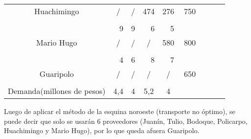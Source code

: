 \documentclass[12pt,letterpaper]{article}
\begin{document}
\begin{center}
\begin{tabular}{ccc|ccc|ccc|ccc|ccc|ccc|ccc}
\multicolumn{3}{c|}{Huachimingo} & \multicolumn{3}{c|}{/} & \multicolumn{3}{c|}{/} & \multicolumn{3}{c|}{474} & \multicolumn{3}{c|}{276}& \multicolumn{3}{c}{750}\\
\multicolumn{3}{c|}{} & \multicolumn{3}{c|}{} & \multicolumn{3}{c|}{} & \multicolumn{3}{c|}{} & \multicolumn{3}{c|}{}\\
\cline{1-15}
\multicolumn{3}{c|}{} & \multicolumn{3}{r|}{9} & \multicolumn{3}{r|}{9} & \multicolumn{3}{r|}{6} & \multicolumn{3}{r|}{5} \\
\multicolumn{3}{c|}{Mario Hugo} & \multicolumn{3}{c|}{/} & \multicolumn{3}{c|}{/} & \multicolumn{3}{c|}{/} & \multicolumn{3}{c|}{580}& \multicolumn{3}{c}{800}\\
\multicolumn{3}{c|}{} & \multicolumn{3}{c|}{} & \multicolumn{3}{c|}{} & \multicolumn{3}{c|}{} & \multicolumn{3}{c|}{}\\
\cline{1-15}
\multicolumn{3}{c|}{} & \multicolumn{3}{r|}{4} & \multicolumn{3}{r|}{6} & \multicolumn{3}{r|}{8} & \multicolumn{3}{r|}{7} \\
\multicolumn{3}{c|}{Guaripolo} & \multicolumn{3}{c|}{/} & \multicolumn{3}{c|}{/} & \multicolumn{3}{c|}{/} & \multicolumn{3}{c|}{/}& \multicolumn{3}{c}{650}\\
\multicolumn{3}{c|}{} & \multicolumn{3}{c|}{} & \multicolumn{3}{c|}{} & \multicolumn{3}{c|}{} & \multicolumn{3}{c|}{}\\
\cline{1-15}
\multicolumn{3}{c|}{Demanda(millones de pesos)} & \multicolumn{3}{c|}{4,4} & \multicolumn{3}{c|}{4} & \multicolumn{3}{c|}{5,2}& \multicolumn{3}{c|}{4} & \multicolumn{3}{c}{}\\
\end{tabular}
\end{center}

Luego de aplicar el método de la esquina noroeste (transporte no óptimo), se puede decir que solo se usarán 6 proveedores (Juanín, Tulio, Bodoque, Policarpo, Huachimingo y Mario Hugo), por lo que queda afuera Guaripolo.
\\ 
\end{document}
